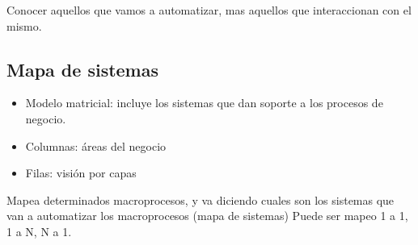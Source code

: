 \documentclass[titlepage,a4paper]{article}
\begin{document}
    
    Conocer aquellos que vamos a automatizar, mas aquellos que interaccionan con el mismo.
    
\subsection{Mapa de sistemas}
    \begin{itemize}
        \item Modelo matricial: incluye los sistemas que dan soporte a los procesos de negocio.
        \item Columnas: áreas del negocio
        \item Filas: visión por capas
    \end{itemize}

Mapea determinados macroprocesos, y va diciendo cuales son los sistemas que van a automatizar los macroprocesos (mapa de sistemas) Puede ser mapeo 1 a 1, 1 a N, N a 1.
\end{document}
